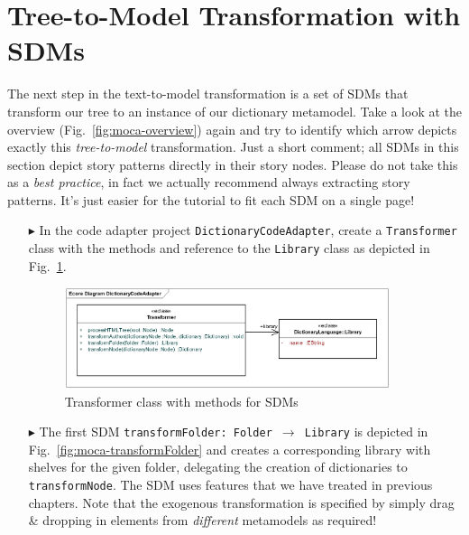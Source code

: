 \section{Tree-to-Model Transformation with SDMs}

The next step in the text-to-model transformation is a set of SDMs that transform our tree to an instance of our dictionary metamodel.
Take a look at the overview (Fig.~\ref{fig:moca-overview}) again and try to identify which arrow depicts exactly this \emph{tree-to-model} transformation.
Just a short comment;  all SDMs in this section depict story patterns directly in their story nodes.
Please do not take this as a \emph{best practice}, in fact we actually recommend always extracting story patterns.
It's just easier for the tutorial to fit each SDM on a single page!

\begin{enumerate}
  \item[$\blacktriangleright$]  In the code adapter project \texttt{DictionaryCodeAdapter}, create a \texttt{Trans\-for\-mer} class with the methods and reference to the \texttt{Library} class as depicted in Fig.~\ref{fig:moca-DictionaryCodeAdapter}.
\begin{figure}[!htbp]
\begin{center}
 \includegraphics[width=0.9\textwidth]{pics/moca/3MocaTreeToModel/DictionaryCodeAdapter}
  \caption{Transformer class with methods for SDMs}
  \label{fig:moca-DictionaryCodeAdapter}
\end{center}
\end{figure}
\item[$\blacktriangleright$]  The first SDM \texttt{transformFolder:~Folder~$\rightarrow$~Library} is depicted in Fig.~\ref{fig:moca-transformFolder} and creates a corresponding library with shelves for the given folder, delegating the creation of dictionaries to \texttt{transformNode}.
The SDM uses features that we have treated in previous chapters.
Note that the exogenous transformation is specified by simply drag \& dropping in elements from \emph{different} metamodels as required!

\end{enumerate}
